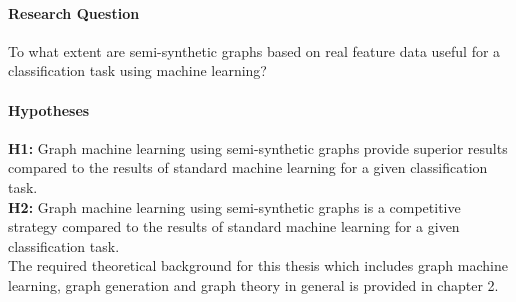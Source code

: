 	\paragraph{Research Question}\mbox{}

	\noindent To what extent are semi-synthetic graphs based on real 
				feature data useful for a classification task using machine
				learning?

	\paragraph{Hypotheses}\mbox{}

	\noindent\textbf{H1:} Graph machine learning using semi-synthetic graphs
	provide superior results compared to the results of standard machine
	learning for a given classification task.\\

	\noindent\textbf{H2:} Graph machine learning using semi-synthetic graphs is
	a competitive strategy compared to the results of standard machine
	learning for a given classification task.\\


	\noindent The required theoretical background for this thesis which
	includes graph machine learning, graph generation and graph theory in
	general is provided in chapter 2.
